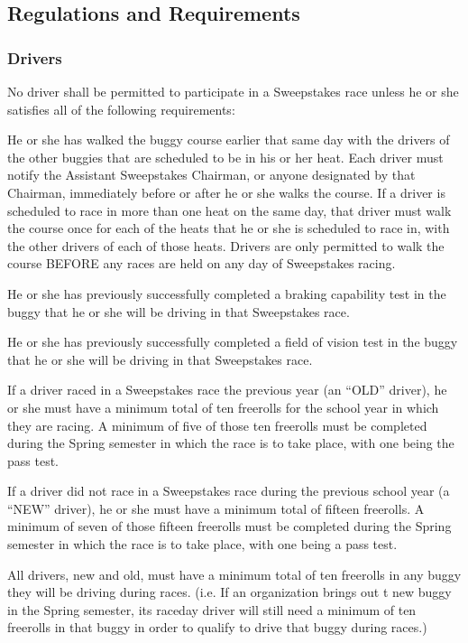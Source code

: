 \subsection{Regulations and Requirements}

\subsubsection{Drivers}

No driver shall be permitted to participate in a Sweepstakes race unless he or she satisfies all of the following requirements:

He or she has walked the buggy course earlier that same day with the drivers of the other buggies that are scheduled to be in his or her heat. Each driver must notify the Assistant Sweepstakes Chairman, or anyone designated by that Chairman, immediately before or after he or she walks the course. If a driver is scheduled to race in more than one heat on the same day, that driver must walk the course once for each of the heats that he or she is scheduled to race in, with the other drivers of each of those heats. Drivers are only permitted to walk the course BEFORE any races are held on any day of Sweepstakes racing.

He or she has previously successfully completed a braking capability test in the buggy that he or she will be driving in that Sweepstakes race.

He or she has previously successfully completed a field of vision test in the buggy that he or she will be driving in that Sweepstakes race.

If a driver raced in a Sweepstakes race the previous year (an ``OLD'' driver), he or she must have a minimum total of ten freerolls for the school year in which they are racing. A minimum of five of those ten freerolls must be completed during the Spring semester in which the race is to take place, with one being the pass test.

If a driver did not race in a Sweepstakes race during the previous school year (a ``NEW'' driver), he or she must have a minimum total of fifteen freerolls. A minimum of seven of those fifteen freerolls must be completed during the Spring semester in which the race is to take place, with one being a pass test.

All drivers, new and old, must have a minimum total of ten freerolls in any buggy they will be driving during races. (i.e. If an organization brings out t new buggy in the Spring semester, its raceday driver will still need a minimum of ten freerolls in that buggy in order to qualify to drive that buggy during races.)

